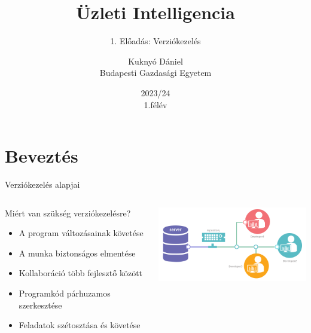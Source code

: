 \documentclass[english, aspectratio=169]{beamer}
\makeatletter
\newcommand\makebeamertitle{\frame{\maketitle}}
\let\origtableofcontents=\tableofcontents
\def\tableofcontents{\@ifnextchar[{\origtableofcontents}{\gobbletableofcontents}}
\def\gobbletableofcontents#1{\origtableofcontents}
\makeatother
\begin{document}
\section{Beveztés}
\title[]{Üzleti Intelligencia}
\subtitle{1. Előadás: Verziókezelés}
\author[Kuknyó Dániel]{Kuknyó Dániel\\Budapesti Gazdasági Egyetem}
\date{2023/24\\1.félév}
\makebeamertitle

\begin{frame}
\tableofcontents{}
\end{frame}

\begin{frame}
	\tableofcontents[currentsection]
\end{frame}

\begin{frame}{Verziókezelés alapjai}
\begin{columns}
\begin{column}{0.5\textwidth}
Miért van szükség verziókezelésre?
\begin{itemize}
	\item A program változásainak követése
	\item A munka biztonságos elmentése
	\item Kollaboráció több fejlesztő között
	\item Programkód párhuzamos szerkesztése
	\item Feladatok szétosztása és követése
\end{itemize}
\end{column}
\begin{column}{0.5\textwidth}
\begin{center}
\includegraphics[width=7cm, keepaspectratio]{images/version_control.png}
\end{center}
\end{column}
\end{columns}
\end{frame}
\end{document}
